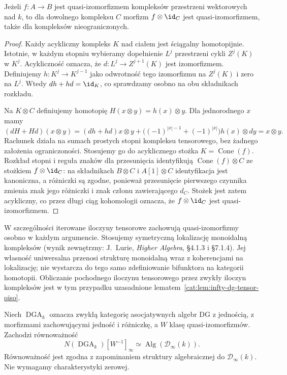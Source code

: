 \begin{lemat}\label{cat:lem:infty-dg-tensor-qiso}
Jeżeli $f:A\to B$ jest quasi-izomorfizmem kompleksów przestrzeni wektorowych nad $k$, to dla dowolnego kompleksu $C$ morfizm $f\otimes\id_C$ jest quasi-izomorfizmem, także dla kompleksów nieograniczonych.
\end{lemat}
\begin{proof}
Każdy acykliczny kompleks $K$ nad ciałem jest ściągalny homotopijnie. Istotnie, w każdym stopniu wybieramy dopełnienie $L^j$ przestrzeni cykli $Z^j(K)$ w $K^j$. Acykliczność oznacza, że $d:L^j\to Z^{j+1}(K)$ jest izomorfizmem. Definiujemy $h:K^j\to K^{j-1}$ jako odwrotność tego izomorfizmu na $Z^j(K)$ i zero na $L^j$. Wtedy $dh+hd=\id_K$, co sprawdzamy osobno na obu składnikach rozkładu.

Na $K\otimes C$ definiujemy homotopię $H(x\otimes y)=h(x)\otimes y$. Dla jednorodnego $x$ mamy
\[
 (dH+Hd)(x\otimes y)
 =(dh+hd)x\otimes y+
 \bigl((-1)^{|x|-1}+(-1)^{|x|}\bigr)h(x)\otimes dy
 =x\otimes y.
\]
Rachunek działa na sumach prostych stopni kompleksu tensorowego, bez żadnego założenia ograniczoności. Stosujemy go do acyklicznego stożka $K=\operatorname{Cone}(f)$. Rozkład stopni i reguła znaków dla przesunięcia identyfikują $\operatorname{Cone}(f)\otimes C$ ze stożkiem $f\otimes\id_C$: na składnikach $B\otimes C$ i $A[1]\otimes C$ identyfikacja jest kanoniczna, a różniczki są zgodne, ponieważ przesunięcie pierwszego czynnika zmienia znak jego różniczki i znak członu zawierającego $d_C$. Stożek jest zatem acykliczny, co przez długi ciąg kohomologii oznacza, że $f\otimes\id_C$ jest quasi-izomorfizmem.
\end{proof}

W szczególności iterowane iloczyny tensorowe zachowują quasi-izomorfizmy osobno w każdym argumencie. Stosujemy symetryczną lokalizację monoidalną kompleksów (wynik zewnętrzny: J.~Lurie, \emph{Higher Algebra}, \S4.1.3 i \S7.1.4). Jej własność uniwersalna przenosi strukturę monoidalną wraz z koherencjami na lokalizację; nie wystarcza do tego samo zdefiniowanie bifunktora na kategorii homotopii. Obliczanie pochodnego iloczynu tensorowego przez zwykły iloczyn kompleksów jest w tym przypadku uzasadnione lematem~\ref{cat:lem:infty-dg-tensor-qiso}.

\begin{twierdzenie}\label{cat:thm:infty-associative-rectification}
Niech $\operatorname{DGA}_k$ oznacza zwykłą kategorię asocjatywnych algebr DG z jednością, z morfizmami zachowującymi jedność i różniczkę, a $W$ klasę quasi-izomorfizmów. Zachodzi równoważność
\begin{equation}\label{cat:eq:infty-associative-rectification}
 N(\operatorname{DGA}_k)[W^{-1}]_\infty
 \simeq \operatorname{Alg}(\mathcal D_\infty(k)).
\end{equation}
Równoważność jest zgodna z zapominaniem struktury algebraicznej do $\mathcal D_\infty(k)$. Nie wymagamy charakterystyki zerowej.
\end{twierdzenie}

